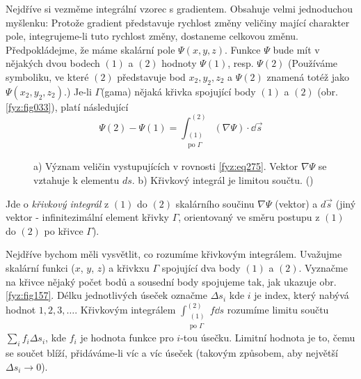     Nejdříve si vezměme integrální vzorec s gradientem. Obsahuje velmi jednoduchou myšlenku: 
    Protože gradient představuje rychlost změny veličiny mající charakter pole, inte\-gru\-jeme-li 
    tuto rychlost změny, dostaneme celkovou změnu. Předpokládejme, že máme skalární pole \(\Psi(x, 
    y, z)\). Funkce \(\Psi\) bude mít v nějakých dvou bodech \((1)\) a \((2)\) hodnoty \(\Psi(1)\), 
    resp. \(\Psi(2)\) (Používáme symboliku, ve které \((2)\) představuje bod \(x_2, y_2, z_2\) a 
    \(\Psi(2)\) znamená totéž jako \(\Psi(x_2, y_2, z_2)\).) Je-li \(\Gamma\)(gama) nějaká 
    křivka spojující body \((1)\) a \((2)\) (obr. \ref{fyz:fig033}), platí následující
    \begin{equation}\label{fyz:eq275}
      \Psi(2)-\Psi(1) = \int_{\substack{(1)\\\text{po }\Gamma}}^{(2)}(\nabla\Psi)\cdot\dd{\vec{s}}
    \end{equation} 

    \begin{figure}[ht!] 
      \centering
      \caption{a) Význam veličin vystupujících v rovnosti \ref{fyz:eq275}. Vektor 
      \(\nabla\Psi\) se vztahuje k elementu \(ds\). b) Křivkový integrál je limitou součtu. 	
               (\cite[s.~46]{Feynman02})}
    \end{figure}

    Jde o \emph{křivkový integrál} z \((1)\) do \((2)\) skalárního součinu \(\nabla\Psi\) (vektor) a
    \(d\vec{s}\) (jiný vektor - infinitezimální element křivky \(\Gamma\), orientovaný ve směru  
    postupu z \((1)\) do \((2)\) po křivce \(\Gamma\)).
    
    Nejdříve bychom měli vysvětlit, co rozumíme křivkovým integrálem. Uvažujme skalární funkci 
    (\(x\), \(y\), \(z\)) a křivkxu \(\Gamma\) spojující dva body \((1)\) a \((2)\). Vyznačme na 
    křivce nějaký počet bodů a sousední body spojujeme tak, jak ukazuje obr.  \ref{fyz:fig157}. 
    Délku jednotlivých úseček označme \(\Delta s_i\) kde \(i\) je index, který nabývá hodnot 
    \(1,2,3,\ldots\). Křivkovým integrálem \(\displaystyle\int_{\substack{(1)\\\text{po 
    }\Gamma}}^{(2)}f\dd{s}\) rozumíme limitu součtu \(\displaystyle\sum_i f_i\Delta s_i\), kde 
    \(f_i\) je hodnota funkce pro \(i\)-tou úsečku. Limitní hodnota je to, čemu se součet blíží, 
    přidáváme-li víc a víc úseček (takovým způsobem, aby největší \(\Delta s_i\rightarrow 0\)).
    
